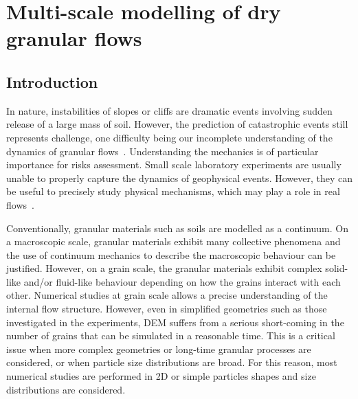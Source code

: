 \chapter{Multi-scale modelling of dry granular flows}

\ifpdf
    \graphicspath{{Chapter4/figs/raster/}{Chapter4/figs/pdf/}{Chapter4/figs/}}
\else
    \graphicspath{{Chapter4/figs/vector/}{Chapter4/figs/}}
\fi

\section{Introduction}

In nature, instabilities of slopes or cliffs are dramatic events involving 
sudden release of a large mass of soil. However, the prediction of catastrophic 
events still represents  challenge, one difficulty being our incomplete 
understanding of the dynamics of granular flows~\citep{Rondon2011}.  
Understanding the mechanics is of particular importance for risks assessment. 
Small scale laboratory experiments are usually unable to properly capture the 
dynamics of geophysical events. However, they can be useful to precisely study 
physical mechanisms, which may play a role in real flows~\citep{Iverson1997}. 

Conventionally, granular materials such as soils are modelled as a continuum. 
On a macroscopic scale, granular materials exhibit many collective phenomena 
and the use of continuum mechanics to describe the macroscopic behaviour can be 
justified. However, on a grain scale, the granular materials exhibit complex 
solid-like and/or fluid-like behaviour depending on how the grains interact 
with each other. Numerical studies at grain scale allows a precise 
understanding of the internal flow structure. However, even in simplified 
geometries such as those investigated in the experiments, DEM suffers from a 
serious short-coming in the number of grains that can be simulated in 
a reasonable time. This is a critical issue when more complex geometries or 
long-time granular processes are considered, or when particle size 
distributions are broad. For this reason, most numerical studies are performed 
in 2D or simple particles shapes and size distributions are considered. 

